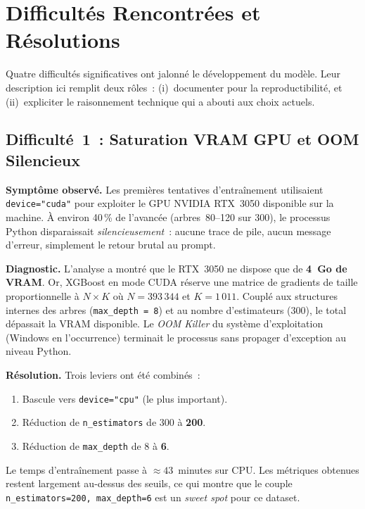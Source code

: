 \documentclass[11pt, a4paper]{article}
\begin{document}
\newpage
\section{Difficultés Rencontrées et Résolutions}

Quatre difficultés significatives ont jalonné le développement du
modèle. Leur description ici remplit deux rôles~: (i)~documenter pour
la reproductibilité, et (ii)~expliciter le raisonnement technique qui a
abouti aux choix actuels.

\subsection{Difficulté~1~: Saturation VRAM GPU et OOM Silencieux}

\textbf{Symptôme observé.} Les premières tentatives d'entraînement
utilisaient \texttt{device="cuda"} pour exploiter le GPU NVIDIA RTX~3050
disponible sur la machine. À environ 40\,\% de l'avancée
(arbres~80--120 sur 300), le processus Python disparaissait
\textit{silencieusement}~: aucune trace de pile, aucun message
d'erreur, simplement le retour brutal au prompt.

\textbf{Diagnostic.} L'analyse a montré que le RTX~3050 ne dispose que
de \textbf{4~Go de VRAM}. Or, XGBoost en mode CUDA réserve une
matrice de gradients de taille proportionnelle à
$N \times K$ où $N = 393\,344$ et $K = 1\,011$. Couplé aux
structures internes des arbres (\texttt{max\_depth = 8}) et au nombre
d'estimateurs (300), le total dépassait la VRAM disponible. Le \textit{OOM
Killer} du système d'exploitation (Windows en l'occurrence) terminait le
processus sans propager d'exception au niveau Python.

\textbf{Résolution.} Trois leviers ont été combinés~:
\begin{enumerate}
\item Bascule vers \texttt{device="cpu"} (le plus important).
\item Réduction de \texttt{n\_estimators} de 300 à \textbf{200}.
\item Réduction de \texttt{max\_depth} de 8 à \textbf{6}.
\end{enumerate}

Le temps d'entraînement passe à $\approx 43$~minutes sur CPU. Les
métriques obtenues restent largement au-dessus des seuils, ce qui
montre que le couple \texttt{n\_estimators=200, max\_depth=6} est un
\textit{sweet spot} pour ce dataset.
\end{document}

